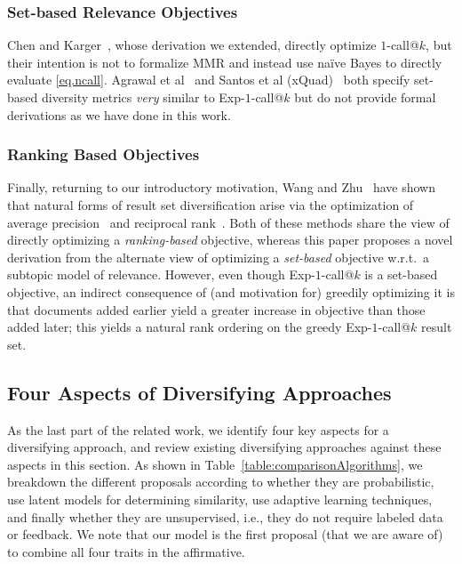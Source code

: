 \subsubsection{Set-based Relevance Objectives} 
Chen and Karger~\cite{chen06Less}, whose derivation we extended, directly
optimize $1$-call@$k$, but their intention is not to formalize MMR and
instead use na\"{i}ve Bayes to directly evaluate
\eqref{eq.ncall}.  Agrawal et al~\cite{agrawal09diversifying}
and Santos et al (xQuad)~\cite{santos2010xquad} both specify set-based
diversity metrics \emph{very} similar to Exp-$1$-call@$k$ but do not provide
formal derivations as we have done in this work.

\subsubsection{Ranking Based Objectives} 
Finally, returning to our introductory motivation, Wang and Zhu~\cite{wangzhu10} have shown that
natural forms of result set diversification arise via the optimization
of average precision~\cite{ap} and reciprocal rank~\cite{mrr}.  Both
of these methods share the view of directly optimizing a
\emph{ranking-based} objective, whereas this paper proposes a novel
derivation from the alternate view of optimizing a \emph{set-based}
objective w.r.t.\ a subtopic model of relevance.  However, even though
Exp-$1$-call@$k$ is a set-based objective, an indirect consequence of
(and motivation for) greedily optimizing it is that documents added
earlier yield a greater increase in objective than those added later;
this yields a natural rank ordering on the greedy Exp-$1$-call@$k$
result set.

\subsection{Four Aspects of Diversifying Approaches}
As the last part of the related work, we identify four key aspects for a diversifying approach, and review existing diversifying approaches against these aspects in this section. As shown in Table~\ref{table:comparisonAlgorithms}, we breakdown the
different proposals according to whether they are probabilistic, use
latent models for determining similarity, use adaptive learning
techniques, and finally whether they are unsupervised, i.e., they do
not require labeled data or feedback. We note that our model is the first
proposal (that we are aware of) to combine all four traits in the
affirmative. 

